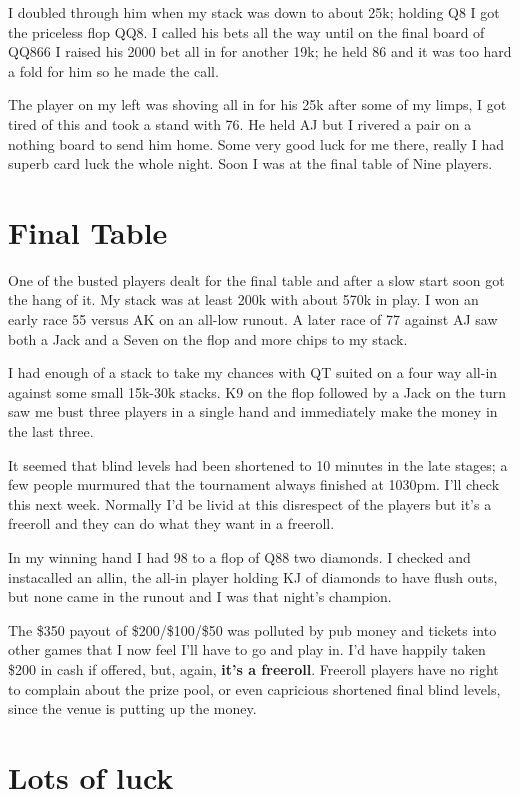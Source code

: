 I doubled through him when my stack was down to about 25k; holding
Q8 I got the priceless flop QQ8. I called his bets all the way
until on the final board of QQ866 I raised his 2000 bet all in
for another 19k; he held 86 and it was too hard a fold for him
so he made the call.

The player on my left was shoving all in for his 25k after some
of my limps, I got tired of this and took a stand with 76. He
held AJ but I rivered a pair on a nothing board to send him
home. Some very good luck for me there, really I had superb
card luck the whole night. Soon I was at the final table of
Nine players.

\section{Final Table}

One of the busted players dealt for the final table and after
a slow start soon got the hang of it. My stack was at least
200k with about 570k in play. I won an early race 55 versus AK
on an all-low runout. A later race of 77 against AJ saw
both a Jack and a Seven on the flop and more chips to my stack.

I had enough of a stack to take my chances with QT suited on a
four way all-in against some small 15k-30k stacks. K9 on the flop
followed by a Jack on the turn saw me bust three players in
a single hand and immediately make the money in the last three.

It seemed that blind levels had been shortened to 10 minutes in
the late stages; a few people murmured that the tournament
always finished at 1030pm. I'll check this next week. Normally
I'd be livid at this disrespect of the players but it's
a freeroll and they can do what they want in a freeroll.

In my winning hand I had 98 to a flop of Q88 two diamonds.
I checked and instacalled an allin, the all-in player holding
KJ of diamonds to have flush outs, but none came in the runout
and I was that night's champion.

The \$350 payout of \$200/\$100/\$50 was polluted by
pub money and tickets into other games that I now feel
I'll have to go and play in. I'd have happily taken
\$200 in cash if offered, but, again, \textbf{it's a freeroll}.
Freeroll players have no right to complain about the prize pool,
or even capricious shortened final blind levels, since the
venue is putting up the money.

\section{Lots of luck}

